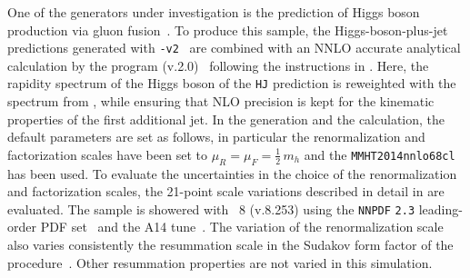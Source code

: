 \subsubsection{\Powheg \NNLOPS}
\label{sec:hjetscomp:tools:nnlops:powheg}

One of the generators under investigation is the \NNLOPS prediction 
of Higgs boson production via gluon fusion~\cite{Hamilton:2013fea}.
To produce this sample, the Higgs-boson-plus-jet \Minlo~\cite{Hamilton:2012np} 
predictions generated with \PowhegBox{}\texttt{-v2}~\cite{Campbell:2012am} 
are combined with an NNLO accurate analytical calculation by the 
program \HNNLO (v.2.0)~\cite{Catani:2007vq,Grazzini:2008tf,Grazzini:2013mca} 
following the instructions in \cite{Hamilton:2013fea}. Here, the rapidity 
spectrum of the Higgs boson of the \Powheg \texttt{HJ} \Minlo prediction 
is reweighted with the spectrum from \HNNLO, while ensuring that NLO 
precision is kept for the kinematic properties of the first additional jet. 
In the generation and the \HNNLO calculation, the default parameters are 
set as follows, in particular the renormalization and factorization scales 
have been set to $\mu_R = \mu_F = \tfrac{1}{2}\,m_h$ and the 
\texttt{MMHT2014nnlo68cl} \cite{Harland-Lang:2014zoa} has been used. 
To evaluate the uncertainties in the choice of the renormalization and 
factorization scales, the 21-point scale variations described in detail 
in \cite{Hamilton:2013fea} are evaluated.
The \NNLOPS sample is showered with \Pythia~8 (v.8.253) \cite{Sjostrand:2014zea} 
using the \texttt{NNPDF} \texttt{2.3} leading-order PDF set~\cite{Ball:2012cx} 
and the A14 tune~\cite{ATL-PHYS-PUB-2014-021}. 
The variation of the renormalization scale also varies consistently the 
resummation scale in the Sudakov form factor of the \Minlo 
procedure~\cite{Hamilton:2012rf}. Other resummation properties are not 
varied in this simulation. 

